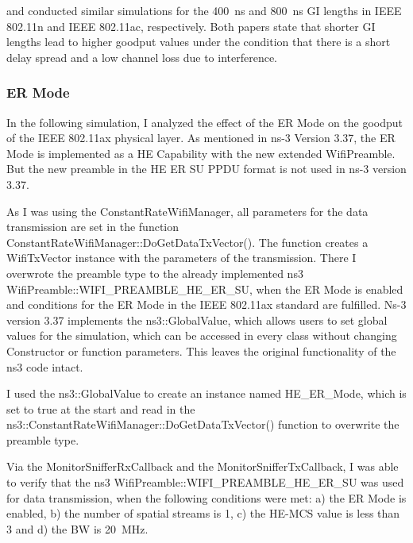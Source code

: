\textcite{patil_ieee_2020} and \textcite{karmakar_s2-gi_2020} conducted similar simulations
for the \SI{400}{\nano\second} and \SI{800}{\nano\second} \ac{GI} lengths in IEEE 802.11n and IEEE 802.11ac, respectively.
Both papers state that shorter \ac{GI} lengths lead to higher goodput values under the condition that there is a short delay spread and a low
channel loss due to interference.

\subsubsection*{\acf{ER} Mode}

In the following simulation, I analyzed the effect of the \ac{ER} Mode on the goodput of the IEEE 802.11ax physical layer.
As mentioned in ns-3 Version 3.37, the \ac{ER} Mode is implemented as a \ac{HE} Capability with the new extended WifiPreamble.
But the new preamble in the \ac{HE} \ac{ER} SU \ac{PPDU} format is not used in ns-3 version 3.37.

As I was using the ConstantRateWifiManager, all parameters for the data transmission are set in the function
ConstantRateWifiManager::DoGetDataTxVector().
The function creates a WifiTxVector instance with the parameters of the
transmission.
There I overwrote the preamble type to the already implemented ns3 WifiPreamble::WIFI\_PREAMBLE\_HE\_ER\_SU, when
the \ac{ER} Mode is enabled and conditions for the \ac{ER} Mode in the IEEE 802.11ax standard \cite{ieee_standard_2021ax} are fulfilled.
Ns-3 version 3.37 implements the ns3::GlobalValue, which allows users to set global values for the simulation, which can be accessed
in every class without changing Constructor or function parameters.
This leaves the original functionality of the ns3 code intact.

I used the ns3::GlobalValue to create an instance named HE\_ER\_Mode, which is set to true at the start and read in the ns3::ConstantRateWifiManager::Do\-Get\-Data\-Tx\-Vector() function
to overwrite the preamble type.

Via the MonitorSnifferRxCallback and the MonitorSnifferTxCallback, I was able to verify that the ns3 WifiPreamble::WIFI\_PREAMBLE\_HE\_ER\_SU was used
for data transmission, when the following conditions were met: a) the \ac{ER} Mode is enabled, b) the number of spatial streams is \num{1}, c) the \ac{HE}-\ac{MCS} value is less than \num{3} and
d) the \ac{BW} is \SI{20}{\mega\hertz}.

